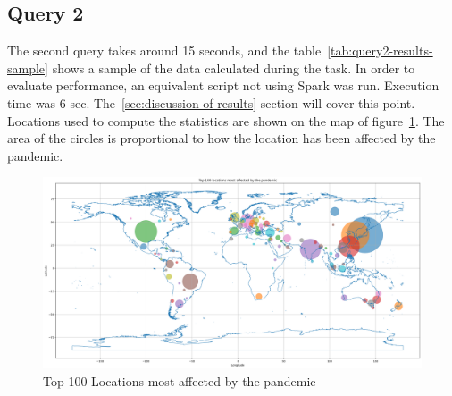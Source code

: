 \documentclass[12pt,oneside]{book} %
\begin{document}
\newpage
\subsection{Query 2}

The second query takes around 15 seconds, and the
table~\ref{tab:query2-results-sample} shows a sample of the data calculated
during the task. In order to evaluate performance, an equivalent script not
using Spark was run. Execution time was 6 sec.
The~\ref{sec:discussion-of-results} section will cover this point. Locations
used to compute the statistics are shown on the map of
figure~\ref{fig:top-100-locations-most-affected}. The area of the circles is
proportional to how the location has been affected by the pandemic.

\begin{figure}[H]
    \centering
    \includegraphics[width=1\linewidth]{images/top-100-locations-most-affected.png}
    \caption{Top 100 Locations most affected by the pandemic}\label{fig:top-100-locations-most-affected}
\end{figure}
\end{document}

